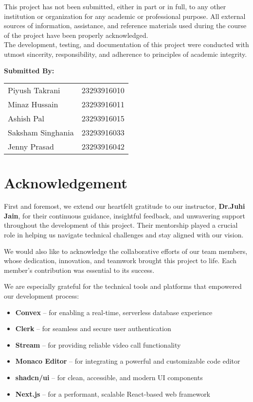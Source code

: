 \documentclass[12pt,a4paper]{report}
\begin{document}
This project has not been submitted, either in part or in full, to any other institution or organization for any academic or professional purpose. All external sources of information, assistance, and reference materials used during the course of the project have been properly acknowledged.
\\
The development, testing, and documentation of this project were conducted with utmost sincerity, responsibility, and adherence to principles of academic integrity.

\vspace{2cm}
{\large\textbf{Submitted By:}\\[0.5em]
\begin{tabular}{ll}
Piyush Takrani      & 23293916010 \\
Minaz Hussain       & 23293916011 \\
Ashish Pal          & 23293916015 \\
Saksham Singhania   & 23293916033 \\
Jenny Prasad        & 23293916042 \\
\end{tabular}
\par}
\clearpage

\chapter*{Acknowledgement}
First and foremost, we extend our heartfelt gratitude to our instructor, \textbf{Dr.Juhi Jain}, for their continuous guidance, insightful feedback, and unwavering support throughout the development of this project. Their mentorship played a crucial role in helping us navigate technical challenges and stay aligned with our vision.


We would also like to acknowledge the collaborative efforts of our team members, whose dedication, innovation, and teamwork brought this project to life. Each member's contribution was essential to its success.

We are especially grateful for the technical tools and platforms that empowered our development process:
\begin{itemize}
    \item \textbf{Convex} – for enabling a real-time, serverless database experience
    \item \textbf{Clerk} – for seamless and secure user authentication
    \item \textbf{Stream} – for providing reliable video call functionality
    \item \textbf{Monaco Editor} – for integrating a powerful and customizable code editor
    \item \textbf{shadcn/ui} – for clean, accessible, and modern UI components
    \item \textbf{Next.js} – for a performant, scalable React-based web framework
\end{itemize}
\end{document}
